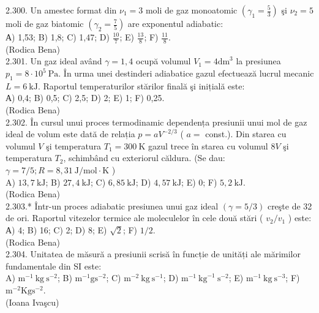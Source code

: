 2.300. Un amestec format din $\nu_{1}=3$ moli de gaz monoatomic $\left(\gamma_{1}=\frac{5}{3}\right)$ şi $\nu_{2}=5$ moli de gaz biatomic $\left(\gamma_{2}=\frac{7}{5}\right)$ are exponentul adiabatic:\\ А) 1,53; B) 1,8; C) 1,47; D) $\frac{10}{7}$; E) $\frac{13}{8}$; F) $\frac{11}{8}$.\\ (Rodica Bena)\\

2.301. Un gaz ideal având $\gamma=1,4$ ocupă volumul $V_{1}=4 \mathrm{dm}^{3}$ la presiunea $p_{1}=8 \cdot 10^{5} \mathrm{~Pa}$. În urma unei destinderi adiabatice gazul efectuează lucrul mecanic $L=6 \mathrm{~kJ}$. Raportul temperaturilor stărilor finală şi inițială este:\\ А) 0,4; B) 0,5; C) 2,5; D) 2; E) 1; F) 0,25.\\ (Rodica Bena)\\

2.302. În cursul unui proces termodinamic dependența presiunii unui mol de gaz ideal de volum este dată de relația $p=a V^{-2 / 3}$ ( $a=$ const.). Din starea cu volumul $V$ şi temperatura $T_{1}=300 \mathrm{~K}$ gazul trece în starea cu volumul $8 V$ şi temperatura $T_{2}$, schimbând cu exteriorul căldura. (Se dau: $\gamma=7 / 5 ; R=8,31 \mathrm{~J} / \mathrm{mol} \cdot \mathrm{K}$ )\\ A) $13,7 \mathrm{~kJ}$; B) $27,4 \mathrm{~kJ}$; C) $6,85 \mathrm{~kJ}$; D) $4,57 \mathrm{~kJ}$; E) 0; F) $5,2 \mathrm{~kJ}$.\\ (Rodica Bena)\\

2.303.* Într-un proces adiabatic presiunea unui gaz ideal $(\gamma=5 / 3)$ creşte de 32 de ori. Raportul vitezelor termice ale moleculelor în cele două stări ( $v_{2} / v_{1}$ ) este:\\ А) 4; B) 16; C) 2; D) 8; E) $\sqrt{2}$; F) $1 / 2$.\\ (Rodica Bena)\\

2.304. Unitatea de măsură a presiunii scrisă în funcție de unități ale mărimilor fundamentale din SI este:\\ A) $\mathrm{m}^{-1} \mathrm{~kg} \mathrm{~s}^{-2}$; B) $\mathrm{m}^{-1} \mathrm{gs}^{-2}$; C) $\mathrm{m}^{-2} \mathrm{~kg} \mathrm{~s}^{-1}$; D) $\mathrm{m}^{-1} \mathrm{~kg}^{-1} \mathrm{~s}^{-2}$; E) $\mathrm{m}^{-1} \mathrm{~kg} \mathrm{~s}^{-3}$; F) $\mathrm{m}^{-2} \mathrm{Kg} \mathrm{s}^{-2}$.\\ (Ioana Ivaşcu)\\

